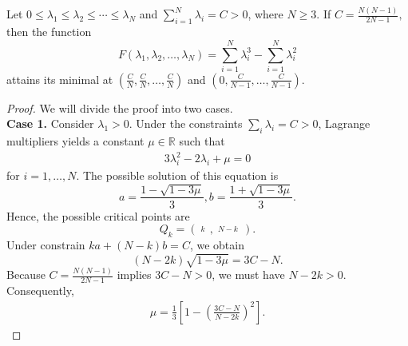 \documentclass[10pt,a4paper]{amsart}
\begin{document}
	\begin{lemma}\label{lemma1}
		Let $0\le {\lambda }_1\le {\lambda }_2\le \cdots \le {\lambda }_N$ and $\sum\limits_{i=1}^{N}{{\lambda }_i}=C>0$, where $N\geq3$. If $C=\frac{N(N-1)}{2N-1},$ then the  function
		\[F(\lambda _{1},\lambda _{2},\ldots,\lambda _{N})=\sum\limits_{i=1}^{N}{\lambda _{i}^3}-\sum\limits_{i=1}^{N}{\lambda _{i}^2}\]
		attains its minimal at $\left( \frac{C}{N},\frac{C}{N},\ldots ,\frac{C}{N} \right)$ and $\left( 0,\frac{C}{N-1},\ldots ,\frac{C}{N-1} \right).$
	\end{lemma}

	\begin{proof} 
		We will divide the proof into two cases.\\
		\textbf{Case 1.} Consider ${\lambda }_1>0$. Under the constraints $\sum\limits_{i}{{{\lambda }_{i}}}=C>0$, Lagrange multipliers yields a constant $\mu \in \mathbb{R}$ such that
		\begin{eqnarray}
			3\lambda _{i}^2-2{\lambda }_i+\mu =0\label{lambda1}
		\end{eqnarray} 
		for $i=1,\ldots ,N.$
		The possible solution of this equation is 
		\[a=\frac{1-\sqrt{1-3\mu }}{3},b=\frac{1+\sqrt{1-3\mu }}{3}.\]
		Hence, the possible critical points are 
		\[Q_k=\left( \overset{k}{\mathop{\overset\frown{a,\ldots ,a}}}\,,\overset{N-k}{\mathop{\overset\frown{b,\ldots ,b}}}\, \right).\]
		Under constrain  $ka+(N-k)b=C$, we obtain
		$$(N-2k)\sqrt{1-3\mu }=3C-N.$$
		Because $C=\frac{N(N-1)}{2N-1}$ implies $3C-N>0$, we must have $N-2k>0$. Consequently, 
		\begin{eqnarray}
			\mu =\frac{1}{3}[1-{\left( \frac{3C-N}{N-2k} \right)^2}].\label{lambda2}
		\end{eqnarray} 
		

\end{proof}
\end{document}
